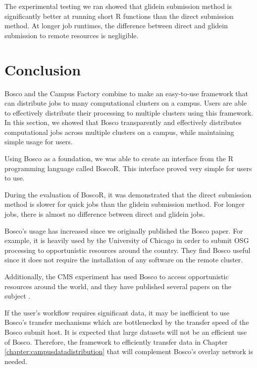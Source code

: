 The experimental testing we ran showed that glidein submission method is significantly better at running short R functions than the direct submission method.  At longer job runtimes, the difference between direct and glidein submission to remote resources is negligible.






\section{Conclusion}

Bosco and the Campus Factory combine to make an easy-to-use framework that can distribute jobs to many computational clusters on a campus.  Users are able to effectively distribute their processing to multiple clusters using this framework.  In this section, we showed that Bosco transparently and effectively distributes computational jobs across multiple clusters on a campus, while maintaining simple usage for users.

Using Bosco as a foundation, we was able to create an interface from the R programming language called BoscoR.  This interface proved very simple for users to use.  

During the evaluation of BoscoR, it was demonstrated that the direct submission method is slower for quick jobs than the glidein submission method.  For longer jobs, there is almost no difference between direct and glidein jobs.

Bosco's usage has increased since we originally published the Bosco paper.  For example, it is heavily used by the University of Chicago in order to submit OSG processing to opportunistic resources around the country.  They find Bosco useful since it does not require the installation of any software on the remote cluster.

Additionally, the CMS experiment has used Bosco to access opportunistic resources around the world, and they have published several papers on the subject \cite{hufnagelcmsopportunistic, piperovoperationalchep15, wagner2013using, kreuzer2014opportunistic}.

If the user's workflow requires significant data, it may be inefficient to use Bosco's transfer mechanisms which are bottlenecked by the transfer speed of the Bosco submit host.  It is expected that large datasets will not be an efficient use of Bosco.  Therefore, the framework to efficiently transfer data in Chapter \ref{chapter:campusdatadistribution} that will complement Bosco's overlay network is needed.




